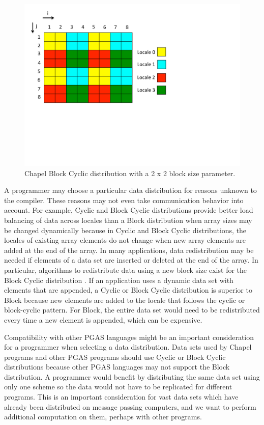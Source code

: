 \begin{figure}
	\begin{center}
	\includegraphics[scale=0.55]{./Figures/block_cyc_dist}
	\caption{Chapel Block Cyclic distribution with a 2 x 2 block size parameter.}
	\label{block_cyc_dist}
	\end{center}
\end{figure}

A programmer may choose a particular data distribution for reasons unknown to the compiler. These reasons may not even take communication behavior into account. For example, Cyclic and Block Cyclic distributions provide better load balancing of data across locales than a Block distribution when array sizes may be changed dynamically because in Cyclic and Block Cyclic distributions, the locales of existing array elements do not change when new array elements are added at the end of the array. In many applications, data redistribution may be needed if elements of a data set are inserted or deleted at the end of the array. In particular, algorithms to redistribute data using a new block size exist for the Block Cyclic distribution \cite{prylli1997fast,walker1996redistribution}. If an application uses a dynamic data set with elements that are appended, a Cyclic or Block Cyclic distribution is superior to Block because new elements are added to the locale that follows the cyclic or block-cyclic pattern. For Block, the entire data set would need to be redistributed every time a new element is appended, which can be expensive. 

Compatibility with other PGAS languages might be an important consideration for a programmer when selecting a data distribution. Data sets used by Chapel programs and other PGAS programs should use Cyclic or Block Cyclic distributions because other PGAS languages may not support the Block distribution. A programmer would benefit by distributing the same data set using only one scheme so the data would not have to be replicated for different programs. This is an important consideration for vast data sets which have already been distributed on message passing computers, and we want to perform additional computation on them, perhaps with other programs.  

